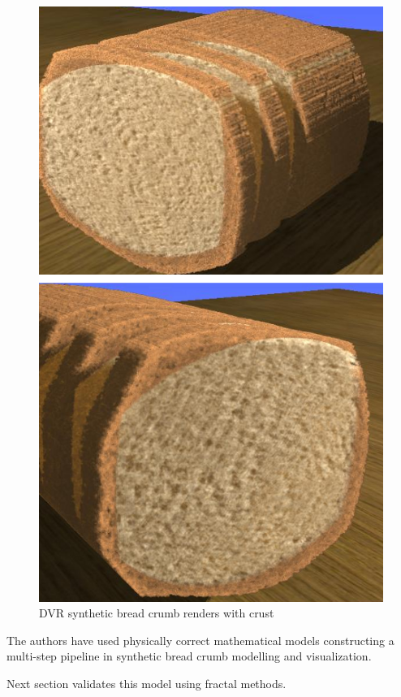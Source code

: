\documentclass[final,5p,times]{elsarticle}
\begin{document}
{\begin{figure}[!ht]
\begin{center}
\includegraphics[scale=0.35]{crusts3.png}
\caption{DVR synthetic bread crumb renders with crust}
\label{FigRenders2}
\end{center}
\end{figure}

The authors have used physically correct mathematical models constructing a multi-step pipeline in synthetic bread crumb modelling and visualization. 

Next section validates this model using fractal methods.

}
\end{document}
